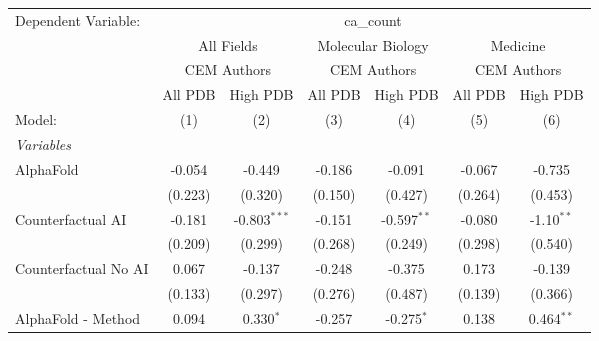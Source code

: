 \begingroup
\centering
\begin{tabular}{lcccccc}
   \tabularnewline \midrule \midrule
   Dependent Variable: & \multicolumn{6}{c}{ca\_count}\\
 & \multicolumn{2}{c}{All Fields} & \multicolumn{2}{c}{Molecular Biology} & \multicolumn{2}{c}{Medicine} \\
\cmidrule(lr){2-3} \cmidrule(lr){4-5} \cmidrule(lr){6-7}
 & \multicolumn{2}{c}{CEM Authors} & \multicolumn{2}{c}{CEM Authors} & \multicolumn{2}{c}{CEM Authors} \\
\cmidrule(lr){2-3} \cmidrule(lr){4-5} \cmidrule(lr){6-7}
 & \multicolumn{1}{c}{All PDB} & \multicolumn{1}{c}{High PDB} & \multicolumn{1}{c}{All PDB} & \multicolumn{1}{c}{High PDB} & \multicolumn{1}{c}{All PDB} & \multicolumn{1}{c}{High PDB} \\
\cmidrule(lr){2-2} \cmidrule(lr){3-3} \cmidrule(lr){4-4} \cmidrule(lr){5-5} \cmidrule(lr){6-6} \cmidrule(lr){7-7}
   Model:                                                     & (1)           & (2)            & (3)           & (4)           & (5)           & (6)\\  
   \midrule
   \emph{Variables}\\
   AlphaFold                                                  & -0.054        & -0.449         & -0.186        & -0.091        & -0.067        & -0.735\\   
                                                              & (0.223)       & (0.320)        & (0.150)       & (0.427)       & (0.264)       & (0.453)\\   
   Counterfactual AI                                          & -0.181        & -0.803$^{***}$ & -0.151        & -0.597$^{**}$ & -0.080        & -1.10$^{**}$\\   
                                                              & (0.209)       & (0.299)        & (0.268)       & (0.249)       & (0.298)       & (0.540)\\   
   Counterfactual No AI                                       & 0.067         & -0.137         & -0.248        & -0.375        & 0.173         & -0.139\\   
                                                              & (0.133)       & (0.297)        & (0.276)       & (0.487)       & (0.139)       & (0.366)\\   
   AlphaFold - Method                                         & 0.094         & 0.330$^{*}$    & -0.257        & -0.275$^{*}$  & 0.138         & 0.464$^{**}$\\   

\end{tabular}
